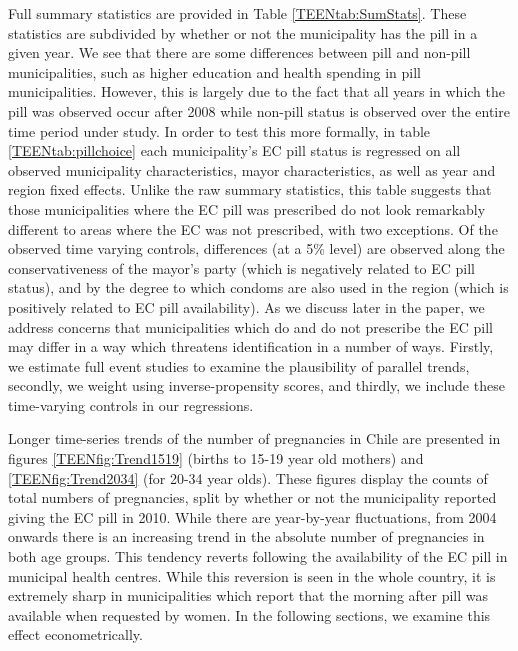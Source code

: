 Full summary statistics are provided in Table \ref{TEENtab:SumStats}.  These
statistics are subdivided by whether or not the municipality has the pill in
a given year.  We see that there are some differences between pill and non-pill
municipalities, such as higher education and health spending in pill 
municipalities.  However, this is largely due to the fact that all years in which
the pill was observed occur after 2008 while non-pill status is observed over
the entire time period under study.  In order to test this more formally, in
table \ref{TEENtab:pillchoice} each municipality's EC pill status is regressed
on all observed municipality characteristics, mayor characteristics, as well as 
year and region fixed effects.  Unlike the raw summary statistics, this table 
suggests that those municipalities where the EC pill was prescribed do not look
remarkably different to areas where the EC was not prescribed, with two 
exceptions.  Of the observed time varying controls, differences (at a 5\% level)
are observed along the conservativeness of the mayor's party (which is negatively 
related to EC pill status), and by the degree to which condoms are also used in 
the region (which is positively related to EC pill availability).  As we discuss 
later in the paper, we address concerns that municipalities which do and do not 
prescribe the EC pill may differ in a way which threatens identification in a 
number of ways.  Firstly, we estimate full event studies to examine the 
plausibility of parallel trends, secondly, we weight using inverse-propensity 
scores, and thirdly, we include these time-varying controls in our regressions.

Longer time-series trends of the number of pregnancies in Chile are presented
in figures \ref{TEENfig:Trend1519} (births to 15-19 year old mothers) and 
\ref{TEENfig:Trend2034} (for 20-34 year olds).  These figures display the counts 
of total numbers of pregnancies, split by whether or not the municipality 
reported giving the EC pill in 2010.  While there are year-by-year fluctuations, 
from 2004 onwards there is an increasing trend in the absolute number of 
pregnancies in both age groups.  This tendency reverts following the availability 
of the EC pill in municipal health centres.  While this reversion is seen in the 
whole country, it is extremely sharp in municipalities which report that the 
morning after pill was available when requested by women.  In the following 
sections, we examine this effect econometrically.

